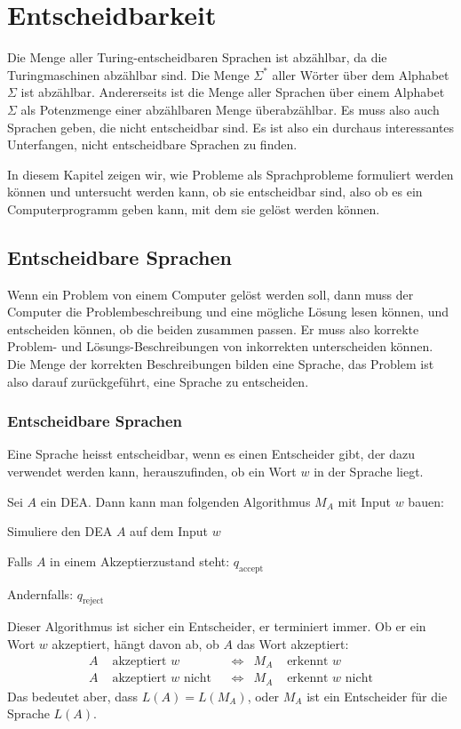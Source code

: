 %
%
\chapter{Entscheidbarkeit\label{chapter-entscheidbarkeit}}
\rhead{}
Die Menge aller Turing-entscheidbaren Sprachen ist abzählbar,
da die Turingmaschinen abzählbar sind.
Die Menge $\Sigma^*$ aller Wörter über dem Alphabet $\Sigma$ ist abzählbar.
Andererseits ist die Menge aller Sprachen über einem Alphabet $\Sigma$
als Potenzmenge einer abzählbaren Menge überabzählbar.
Es muss also auch Sprachen geben, die nicht entscheidbar sind.
Es ist also
ein durchaus interessantes Unterfangen, nicht entscheidbare Sprachen
zu finden.

In diesem Kapitel zeigen wir, wie Probleme als Sprachprobleme
formuliert werden können und untersucht werden kann, ob sie entscheidbar sind,
also ob es ein Computerprogramm geben kann, mit dem sie gelöst werden
können.

\section{Entscheidbare Sprachen}
%
Wenn ein Problem von einem Computer gelöst werden soll, dann
muss der Computer die Problembeschreibung und eine mögliche Lösung
lesen können, und entscheiden können, ob die beiden zusammen passen.
Er muss also korrekte Problem- und Lösungs-Beschreibungen von
inkorrekten unterscheiden können.
Die Menge der korrekten
Beschreibungen bilden eine Sprache, das Problem ist also darauf
zurückgeführt, eine Sprache zu entscheiden.

\subsection{Entscheidbare Sprachen}
Eine Sprache heisst entscheidbar, wenn es einen Entscheider gibt, der
dazu verwendet werden kann, herauszufinden, ob ein Wort $w$ in der Sprache
liegt.

\begin{beispiel}
Sei $A$ ein DEA.
Dann kann man folgenden Algorithmus $M_A$ mit Input $w$ bauen:
\begin{compactenum}
\item Simuliere den DEA $A$ auf dem Input $w$
\item Falls $A$ in einem Akzeptierzustand steht: $q_{\text{accept}}$
\item Andernfalls: $q_{\text{reject}}$
\end{compactenum}
Dieser Algorithmus ist sicher ein Entscheider, er terminiert immer.
Ob er ein Wort $w$ akzeptiert, hängt davon ab, ob $A$ das Wort akzeptiert:
\begin{align*}
  A&\text{ akzeptiert $w$}&
   &\Leftrightarrow&
M_A&\text{ erkennt $w$}
\\
  A&\text{ akzeptiert $w$ nicht}&
   &\Leftrightarrow&
M_A&\text{ erkennt $w$ nicht}
\end{align*}
Das bedeutet aber, dass $L(A)=L(M_A)$, oder $M_A$ ist ein Entscheider für
die Sprache $L(A)$.
\end{beispiel}

